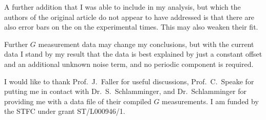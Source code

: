 \documentclass[doublecol]{epl2}
\begin{document}
A further addition that I was able to include in my analysis, but which the authors of the original 
article do not appear to have addressed is that there are also error bars on the on the 
experimental times. This may also weaken their fit.

Further $G$ measurement data may change my conclusions, but with the current data I stand by my 
result that the data is best explained by just a constant offset and an additional unknown 
noise term, and no periodic component is required.

\acknowledgements

I would like to thank Prof.\ J.\ Faller for useful discussions, Prof.\ C.\ Speake for putting me in contact with
Dr.\ S.\ Schlamminger, and Dr.\ Schlamminger for providing me with a data file of their compiled $G$ measurements.
I am funded by the STFC under grant ST/L000946/1.



\end{document}
